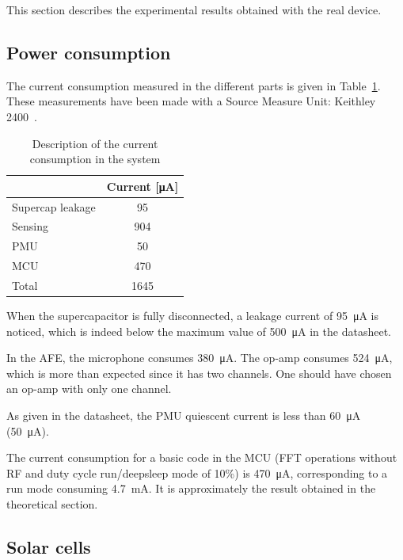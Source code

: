 \documentclass{EPL-master-thesis-covers-EN}
\begin{document}
This section describes the experimental results obtained with the real device.

\subsection*{Power consumption}

The current consumption measured in the different parts is given in Table~\ref{tab:val_current_cons}. These measurements have been made with a Source Measure Unit: Keithley 2400~\cite{Keithley}.

\begin{table}[H]
\centering
\begin{tabular}{lc}
\toprule
                     & Current [\si{\micro A}]  \\ \midrule
 Supercap leakage    & 95                       \\
 Sensing             & 904                     \\
 PMU                 & 50                       \\
 MCU                 & 470                      \\ \midrule
 Total               & 1645                     \\ \bottomrule
\end{tabular}
\caption{Description of the current consumption in the system}
\label{tab:val_current_cons}
\end{table}

When the supercapacitor is fully disconnected, a leakage current of \SI{95}{\micro A} is noticed, which is indeed below the maximum value of \SI{500}{\micro A} in the datasheet.

In the AFE, the microphone consumes \SI{380}{\micro A}. The op-amp consumes \SI{524}{\micro A}, which is more than expected since it has two channels. One should have chosen an op-amp with only one channel.

As given in the datasheet, the PMU quiescent current is less than \SI{60}{\micro A} (\SI{50}{\micro A}).

The current consumption for a basic code in the MCU (FFT operations without RF and  duty cycle run/deepsleep mode of 10\%) is \SI{470}{\micro A}, corresponding to a run mode consuming \SI{4.7}{mA}. It is approximately the result obtained in the theoretical section.

\subsection*{Solar cells}
\end{document}
